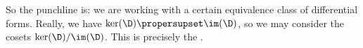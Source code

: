 So the punchline is: we are working with a certain equivalence
class of differential forms. Really, we have
$\ker(\D)\propersupset\im(\D)$, so we may consider the cosets
$\ker(\D)/\im(\D)$. This is precisely the .



